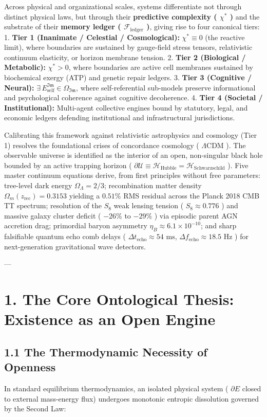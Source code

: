 \documentclass[11pt,a4paper]{article}
\theoremstyle{definition}
\theoremstyle{remark}
\begin{document}
Across physical and organizational scales, systems differentiate not through distinct physical laws, but through their \textbf{predictive complexity ( $\chi^*$ )} and the substrate of their \textbf{memory ledger ( $\mathcal{F}_{\text{ledger}}$ )}, giving rise to four canonical tiers:
1. \textbf{Tier 1 (Inanimate / Celestial / Cosmological):} $\chi^* \equiv 0$ (the reactive limit), where boundaries are sustained by gauge-field stress tensors, relativistic continuum elasticity, or horizon membrane tension.
2. \textbf{Tier 2 (Biological / Metabolic):} $\chi^* > 0$, where boundaries are active cell membranes sustained by biochemical exergy (ATP) and genetic repair ledgers.
3. \textbf{Tier 3 (Cognitive / Neural):} $\exists\, E_{\text{self}}^{\mathfrak{Im}} \in \Omega_{\mathfrak{Im}}$, where self-referential sub-models preserve informational and psychological coherence against cognitive decoherence.
4. \textbf{Tier 4 (Societal / Institutional):} Multi-agent collective engines bound by statutory, legal, and economic ledgers defending institutional and infrastructural jurisdictions.

Calibrating this framework against relativistic astrophysics and cosmology (Tier 1) resolves the foundational crises of concordance cosmology ( $\Lambda\text{CDM}$ ). The observable universe is identified as the interior of an open, non-singular black hole bounded by an active trapping horizon ( $\partial\mathcal{U} \equiv \mathcal{H}_{\text{Hubble}} = \mathcal{H}_{\text{Schwarzschild}}$ ). Five master continuum equations derive, from first principles without free parameters: tree-level dark energy $\Omega_\Lambda = 2/3$; recombination matter density $\Omega_m(z_{\text{rec}}) = 0.3153$ yielding a $0.51\%$ RMS residual across the Planck 2018 CMB TT spectrum; resolution of the $S_8$ weak lensing tension ( $S_8 \approx 0.776$ ) and massive galaxy cluster deficit ( $-26\%$ to $-29\%$ ) via episodic parent AGN accretion drag; primordial baryon asymmetry $\eta_B \approx 6.1 \times 10^{-10}$; and sharp falsifiable quantum echo comb delays ( $\Delta t_{\text{echo}} \approx 54\text{ ms}$, $\Delta f_{\text{echo}} \approx 18.5\text{ Hz}$ ) for next-generation gravitational wave detectors.

---

\section{1. The Core Ontological Thesis: Existence as an Open Engine}

\subsection{1.1 The Thermodynamic Necessity of Openness}
In standard equilibrium thermodynamics, an isolated physical system ( $\partial E$ closed to external mass-energy flux) undergoes monotonic entropic dissolution governed by the Second Law:
\end{document}
